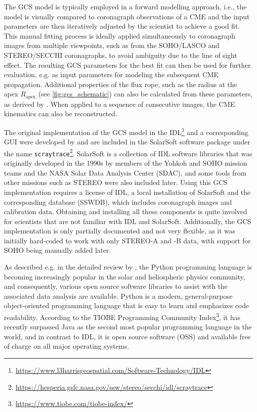 The \ac{GCS} model is typically employed in a forward modelling approach, i.e., the model is visually compared to coronagraph observations of a \ac{CME} and the input parameters are then iteratively adjusted by the scientist to achieve a good fit. This manual fitting process is ideally applied simultaneously to coronagraph images from multiple viewpoints, such as from the \ac{SOHO}/\ac{LASCO} and \ac{STEREO}/\ac{SECCHI} coronagraphs, to avoid ambiguity due to the line of sight effect. The resulting \ac{GCS} parameters for the best fit can then be used for further evaluation, e.g. as input parameters for modeling the subsequent CME propagation. Additional properties of the flux rope, such as the radius at the apex $R_\text{apex}$ (see \autoref{fig:gcs_schematic}) can also be calculated from these parameters, as derived by \citep{Thernisien-2011-GCS}. When applied to a sequence of consecutive images, the \ac{CME} kinematics can also be reconstructed.

The original implementation of the \ac{GCS} model in the \ac{IDL}\footnote{\url{https://www.l3harrisgeospatial.com/Software-Technology/IDL}} and a corresponding \ac{GUI} were developed by \citet{Thernisien-2006-GCS} and are included in the SolarSoft software package \citep{Freeland-1998-SolarSoft} under the name \texttt{scraytrace}\footnote{\url{https://hesperia.gsfc.nasa.gov/ssw/stereo/secchi/idl/scraytrace}}.
SolarSoft is a collection of \ac{IDL} software libraries that was originally developed in the 1990s by members of the Yohkoh and \ac{SOHO} mission teams and the NASA Solar Data Analysis Center (SDAC), and some tools from other missions such as \ac{STEREO} were also included later.
Using this \ac{GCS} implementation requires a license of \ac{IDL}, a local installation of SolarSoft and the corresponding database (SSWDB), which includes coronagraph images and calibration data. Obtaining and installing all these components is quite involved for scientists that are not familiar with \ac{IDL} and SolarSoft. Additionally, the \ac{GCS} implementation is only partially documented and not very flexible, as it was initially hard-coded to work with only \ac{STEREO}-A and -B data, with support for \ac{SOHO} being manually added later.

As described e.g. in the detailed review by \citet{Burrell-2018}, the Python programming language is becoming increasingly popular in the solar and heliospheric physics community, and consequently, various open source software libraries to assist with the associated data analysis are available. Python is a modern, general-purpose object-oriented programming language that is easy to learn and emphasizes code readability. According to the TIOBE Programming Community Index\footnote{\url{https://www.tiobe.com/tiobe-index/}}, it has recently surpassed Java as the second most popular programming language in the world, and in contrast to \ac{IDL}, it is open source software (OSS) and available free of charge on all major operating systems.

